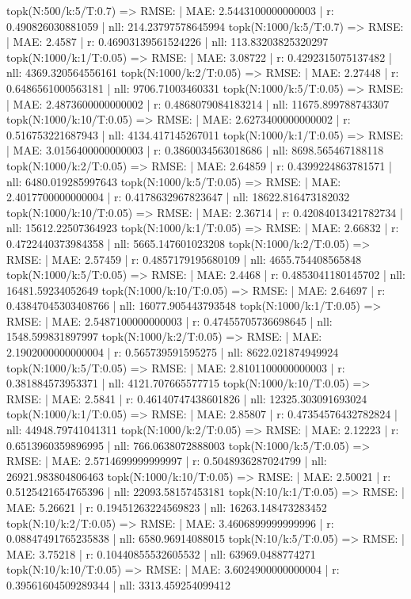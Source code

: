 topk(N:500/k:5/T:0.7) => RMSE: | MAE: 2.5443100000000003 | r: 0.490826030881059 | nll: 214.23797578645994
topk(N:1000/k:5/T:0.7) => RMSE: | MAE: 2.4587 | r: 0.46903139561524226 | nll: 113.83203825320297
topk(N:1000/k:1/T:0.05) => RMSE: | MAE: 3.08722 | r: 0.4292315075137482 | nll: 4369.320564556161
topk(N:1000/k:2/T:0.05) => RMSE: | MAE: 2.27448 | r: 0.6486561000563181 | nll: 9706.71003460331
topk(N:1000/k:5/T:0.05) => RMSE: | MAE: 2.4873600000000002 | r: 0.4868079084183214 | nll: 11675.899788743307
topk(N:1000/k:10/T:0.05) => RMSE: | MAE: 2.6273400000000002 | r: 0.516753221687943 | nll: 4134.417145267011
topk(N:1000/k:1/T:0.05) => RMSE: | MAE: 3.0156400000000003 | r: 0.3860034563018686 | nll: 8698.565467188118
topk(N:1000/k:2/T:0.05) => RMSE: | MAE: 2.64859 | r: 0.4399224863781571 | nll: 6480.019285997643
topk(N:1000/k:5/T:0.05) => RMSE: | MAE: 2.4017700000000004 | r: 0.4178632967823647 | nll: 18622.816473182032
topk(N:1000/k:10/T:0.05) => RMSE: | MAE: 2.36714 | r: 0.42084013421782734 | nll: 15612.22507364923
topk(N:1000/k:1/T:0.05) => RMSE: | MAE: 2.66832 | r: 0.4722440373984358 | nll: 5665.147601023208
topk(N:1000/k:2/T:0.05) => RMSE: | MAE: 2.57459 | r: 0.4857179195680109 | nll: 4655.754408565848
topk(N:1000/k:5/T:0.05) => RMSE: | MAE: 2.4468 | r: 0.4853041180145702 | nll: 16481.59234052649
topk(N:1000/k:10/T:0.05) => RMSE: | MAE: 2.64697 | r: 0.43847045303408766 | nll: 16077.905443793548
topk(N:1000/k:1/T:0.05) => RMSE: | MAE: 2.5487100000000003 | r: 0.47455705736698645 | nll: 1548.599831897997
topk(N:1000/k:2/T:0.05) => RMSE: | MAE: 2.1902000000000004 | r: 0.565739591595275 | nll: 8622.021874949924
topk(N:1000/k:5/T:0.05) => RMSE: | MAE: 2.8101100000000003 | r: 0.381884573953371 | nll: 4121.707665577715
topk(N:1000/k:10/T:0.05) => RMSE: | MAE: 2.5841 | r: 0.46140747438601826 | nll: 12325.303091693024
topk(N:1000/k:1/T:0.05) => RMSE: | MAE: 2.85807 | r: 0.47354576432782824 | nll: 44948.79741041311
topk(N:1000/k:2/T:0.05) => RMSE: | MAE: 2.12223 | r: 0.6513960359896995 | nll: 766.0638072888003
topk(N:1000/k:5/T:0.05) => RMSE: | MAE: 2.5714699999999997 | r: 0.5048936287024799 | nll: 26921.983804806463
topk(N:1000/k:10/T:0.05) => RMSE: | MAE: 2.50021 | r: 0.5125421654765396 | nll: 22093.58157453181
topk(N:10/k:1/T:0.05) => RMSE: | MAE: 5.26621 | r: 0.19451263224569823 | nll: 16263.148473283452
topk(N:10/k:2/T:0.05) => RMSE: | MAE: 3.4606899999999996 | r: 0.08847491765235838 | nll: 6580.96914088015
topk(N:10/k:5/T:0.05) => RMSE: | MAE: 3.75218 | r: 0.10440855532605532 | nll: 63969.0488774271
topk(N:10/k:10/T:0.05) => RMSE: | MAE: 3.6024900000000004 | r: 0.39561604509289344 | nll: 3313.459254099412
